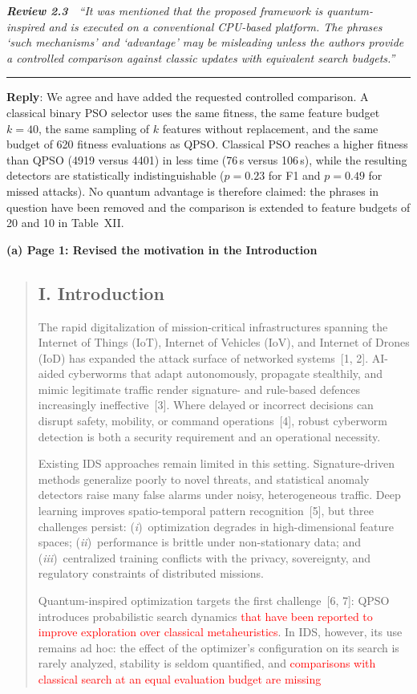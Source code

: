 \documentclass[11pt]{article}
\newenvironment{excerpt}{\begin{quote}\sloppy}{\end{quote}}
\newcommand{\review}[2]{\par\bigskip\noindent\textbf{\textit{Review #1}}\ \ \textit{``#2''}\par\smallskip\hrule\medskip}
\newcommand{\reply}{\noindent\textbf{Reply}: }
\newcommand{\mshead}[2]{\subsection*{\textbf{#1. #2}}}
\newcommand{\loc}[1]{\par\medskip\noindent\textbf{#1}\par}
\begin{document}
\review{2.3}{It was mentioned that the proposed framework is quantum-inspired and is executed on a conventional CPU-based platform. The phrases `such mechanisms' and `advantage' may be misleading unless the authors provide a controlled comparison against classic updates with equivalent search budgets.}

\reply We agree and have added the requested controlled comparison. A
classical binary PSO selector uses the same fitness, the same feature budget
$k=40$, the same sampling of $k$ features without replacement, and the same budget of 620 fitness
evaluations as QPSO. Classical PSO reaches a higher fitness than QPSO (4919
versus 4401) in less time (76\,s versus 106\,s), while the resulting detectors
are statistically indistinguishable ($p=0.23$ for F1 and $p=0.49$ for missed
attacks). No quantum advantage is therefore claimed: the phrases in question
have been removed and the comparison is extended to
feature budgets of 20 and 10 in Table~XII.

\loc{(a) Page 1: Revised the motivation in the Introduction}
\begin{excerpt}
\mshead{I}{Introduction}

The rapid digitalization of mission-critical infrastructures spanning
the Internet of Things (IoT), Internet of Vehicles (IoV), and Internet
of Drones (IoD) has expanded the attack surface of networked
systems~{[1, 2]}. AI-aided cyberworms that
adapt autonomously, propagate stealthily, and mimic legitimate
traffic render signature- and rule-based defences increasingly
ineffective~{[3]}. Where delayed or incorrect decisions can
disrupt safety, mobility, or command operations~{[4]},
robust cyberworm detection is both a security requirement and an
operational necessity.

Existing IDS approaches remain limited in this setting.
Signature-driven methods generalize poorly to novel threats, and
statistical anomaly detectors raise many false alarms under noisy,
heterogeneous traffic. Deep learning improves spatio-temporal pattern
recognition~{[5]}, but three challenges persist:
(\textit{i})~optimization degrades in high-dimensional feature spaces;
(\textit{ii})~performance is brittle under non-stationary data; and
(\textit{iii})~centralized training conflicts with the privacy,
sovereignty, and regulatory constraints of distributed missions.

Quantum-inspired optimization targets the first
challenge~{[6, 7]}: QPSO introduces
probabilistic search dynamics \textcolor{red}{that have been reported
to improve exploration over classical metaheuristics}. In IDS,
however, its use remains ad hoc: the effect of the optimizer's
configuration on its search is rarely analyzed, stability is seldom quantified, and
\textcolor{red}{comparisons with classical search at an equal
evaluation budget are missing}
\end{excerpt}
\end{document}
